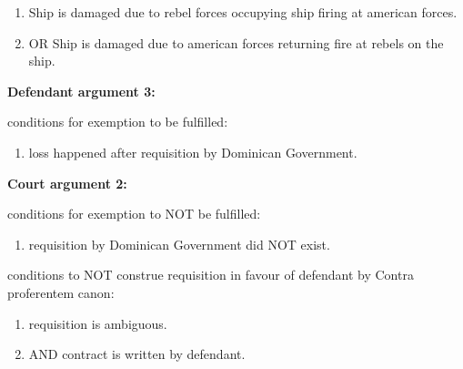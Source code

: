      \begin{enumerate}
        \item Ship is damaged due to rebel forces occupying ship firing at american forces.
        \item OR Ship is damaged due to american forces returning fire at rebels on the ship.
     \end{enumerate}
                
     \textbf{Defendant argument 3:}
     
     conditions for exemption to be fulfilled:
         \begin{enumerate}
             \item loss happened after requisition by Dominican Government.
         \end{enumerate}
     
     
    \textbf{Court argument 2:}
    
     conditions for exemption to NOT be fulfilled:
         \begin{enumerate}
             \item requisition by Dominican Government did NOT exist.
         \end{enumerate}
     
     conditions to NOT construe requisition in favour of defendant by Contra proferentem canon:
         \begin{enumerate}
             \item requisition is ambiguous.
             \item AND contract is written by defendant.
         \end{enumerate}
     

